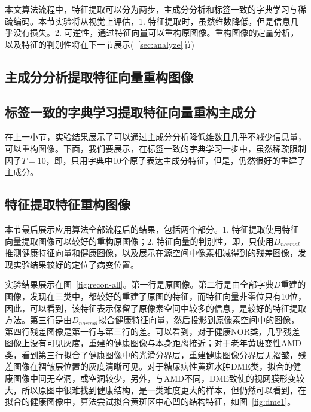     本文算法流程中，特征提取可以分为两步，主成分分析和标签一致的字典学习与稀疏编码。本节实验将从视觉上评估，1. 特征提取时，虽然维数降低，但是信息几乎没有损失。2. 可逆性，通过特征向量可以重构原图像。重构图像的定量分析，以及特征的判别性将在下一节展示(~\ref{sec:analyze}节)

    \subsection{主成分分析提取特征向量重构图像}

    \subsection{标签一致的字典学习提取特征向量重构主成分}
    在上一小节，实验结果展示了可以通过主成分分析降低维数且几乎不减少信息量，可以重构图像。下面，我们要展示，在标签一致的字典学习一步中，虽然稀疏限制因子$T=10$，即，只用字典中10个原子表达主成分特征，但是，仍然很好的重建了主成分。

    \subsection{特征提取特征重构图像}
    本节最后展示应用算法全部流程后的结果，包括两个部分。1. 特征提取使用特征向量提取图像可以较好的重构原图像；2. 特征向量的判别性，即，只使用$D_{normal}$推测健康特征向量和健康图像，以及展示在源空间中像素相减得到的残差图像，发现实验结果较好的定位了病变位置。

    实验结果展示在图~\ref{fig:recon-all}。第一行是原图像。第二行是由全部字典$D$重建的图像，发现在三类中，都较好的重建了原图的特征，而特征向量非零位只有10位，因此，可以看到，该特征表示保留了原像素空间中较多的信息，是较好的特征提取方法。第三行是由$D_{normal}$拟合健康特征向量，然后投影到原像素空间中的图像，第四行残差图像是第一行与第三行的差。可以看到，对于健康NOR类，几乎残差图像上没有可见灰度，重建的健康图像与本身距离接近；对于老年黄斑变性AMD类，看到第三行拟合了健康图像中的光滑分界层，重建健康图像分界层无褶皱，残差图像在褶皱层位置的灰度清晰可见。对于糖尿病性黄斑水肿DME类，拟合的健康图像中间无空洞，或空洞较少，另外，与AMD不同，DME致使的视网膜形变较大，所以原图中很难找到健康结构，是一类难度更大的样本，但仍然可以看到，在拟合的健康图像中，算法尝试拟合黄斑区中心凹的结构特征，如图~\ref{fig:dme1}。

